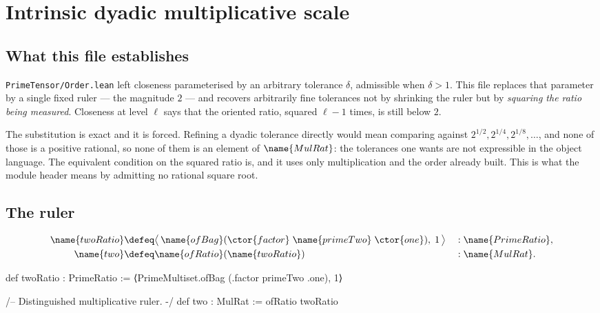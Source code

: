 
\section{Intrinsic dyadic multiplicative scale}
\label{Scale:sec}


\subsection*{What this file establishes}

\texttt{PrimeTensor/Order.lean} left closeness parameterised by an arbitrary
tolerance $\delta$, admissible when $\delta > 1$.  This file replaces that
parameter by a single fixed ruler --- the magnitude $2$ --- and recovers
arbitrarily fine tolerances not by shrinking the ruler but by \emph{squaring
the ratio being measured}.  Closeness at level $\ell$ says that the oriented
ratio, squared $\ell - 1$ times, is still below $2$.

The substitution is exact and it is forced.  Refining a dyadic tolerance
directly would mean comparing against
$2^{1/2}, 2^{1/4}, 2^{1/8}, \dots$, and none of those is a positive rational,
so none of them is an element of $\name{MulRat}$: the tolerances one wants are
not expressible in the object language.  The equivalent condition on the
squared ratio is, and it uses only multiplication and the order already built.
This is what the module header means by admitting no rational square root.

\subsection{The ruler}

\begin{definition}\label{Scale:def:two}
\begin{align*}
  \name{twoRatio} &\defeq
    \bigl\langle\, \name{ofBag}(\ctor{factor}\;\name{primeTwo}\;\ctor{one}),
      \;1 \,\bigr\rangle
    &&: \name{PrimeRatio}, \\
  \name{two} &\defeq \name{ofRatio}(\name{twoRatio})
    &&: \name{MulRat}.
\end{align*}
\end{definition}

\begin{leancode}
def twoRatio : PrimeRatio :=
  ⟨PrimeMultiset.ofBag (.factor primeTwo .one), 1⟩

/-- Distinguished multiplicative ruler. -/
def two : MulRat :=
  ofRatio twoRatio
\end{leancode}

